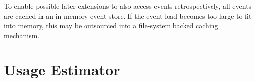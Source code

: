 To enable possible later extensions to also access events retrospectively, all events are cached in an in-memory event
store. If the event load becomes too large to fit into memory, this may be outsourced into a file-system backed caching
mechanism.

%
%
%

\section{Usage Estimator}
\label{sec:usage_estimator}



